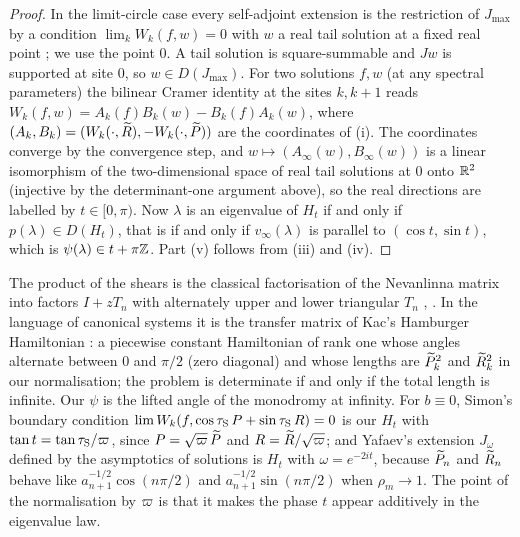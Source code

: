 \begin{proof}
 In the limit-circle case every self-adjoint extension is the
restriction of $J_{\max}$ by a condition $\lim_kW_k(f,w)=0$ with $w$ a real tail solution at
a fixed real point \cite[Thm.~2.6 and \S4]{Simon1998}; we use the point $0$. A tail solution is
square-summable and $Jw$ is supported at site $0$, so $w\in D(J_{\max})$. For two
solutions $f,w$ (at any spectral parameters) the bilinear Cramer identity at the
sites $k,k+1$ reads $W_k(f,w)=A_k(f)B_k(w)-B_k(f)A_k(w)$, where
$(A_k,B_k)=(W_k(\cdot,\widetilde R),-W_k(\cdot,\widetilde P))$ are the coordinates of (i). The coordinates
converge by the convergence step, and $w\mapsto(A_\infty(w),B_\infty(w))$ is a linear
isomorphism of the two-dimensional space of real tail solutions at $0$ onto $\mathbb{R}^2$ (injective by the
determinant-one argument above), so the real directions are
labelled by $t\in[0,\pi)$. Now $\lambda$ is an eigenvalue of $H_t$ if and only if
$p(\lambda)\in D(H_t)$, that is if and only if $v_\infty(\lambda)$ is parallel to
$(\cos t,\sin t)$, which is $\psi(\lambda)\in t+\pi\mathbb{Z}$. Part (v) follows from (iii) and
(iv).
\end{proof}

\begin{remark}\label{rem:kac}
The product of the shears is the classical factorisation of the Nevanlinna matrix into
factors $I+zT_n$ with alternately upper and lower triangular $T_n$
\cite[Ch.~I]{Akhiezer1965}, \cite[eq.~(51)]{BergSzwarc2017}. In the language of
canonical systems it is the transfer matrix of Kac's Hamburger Hamiltonian
\cite{Kac1999}: a piecewise constant Hamiltonian of rank one whose angles alternate
between $0$ and $\pi/2$ (zero diagonal) and whose lengths are $\widetilde P_k^2$ and $\widetilde R_k^2$
in our normalisation; the problem is determinate if and only if the total length is
infinite. Our $\psi$ is the lifted angle of the monodromy at infinity. For $b\equiv0$,
Simon's boundary condition $\lim W_k(f,\cos\tau_{\rm S}\,P+\sin\tau_{\rm S}\,R)=0$
\cite{Simon1998} is our $H_t$ with $\tan t=\tan\tau_{\rm S}/\varpi$, since $P=\sqrt{\varpi}\,\widetilde P$ and
$R=\widetilde R/\sqrt{\varpi}$; and Yafaev's extension $J_\omega$ defined by the asymptotics of
solutions \cite[Thm.~3.9]{Yafaev2021} is $H_t$ with $\omega=e^{-2it}$, because
$\widetilde P_n$ and $\widetilde R_n$ behave like $a_{n+1}^{-1/2}\cos(n\pi/2)$ and
$a_{n+1}^{-1/2}\sin(n\pi/2)$ when $\rho_m\to1$. The point of the normalisation by $\varpi$
is that it makes the phase $t$ appear additively in the eigenvalue law.
\end{remark}

